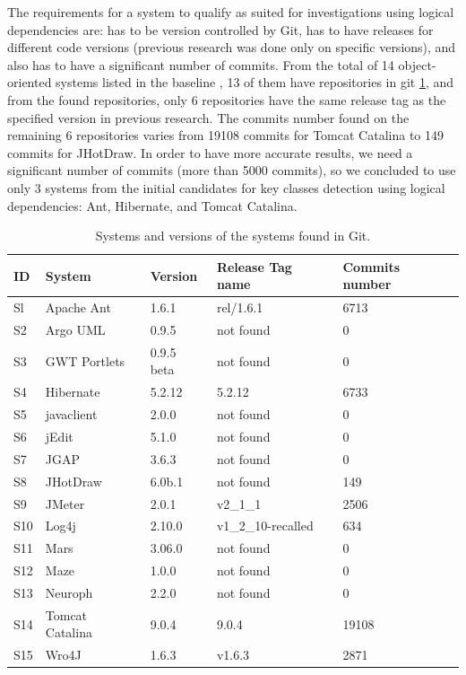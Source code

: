 \documentclass[runningheads]{comsis2}
\begin{document}
The requirements for a system to qualify as suited for investigations using logical dependencies are: has to be version controlled by Git, has to have releases for different code versions (previous research was done only on specific versions), and also has to have a significant number of commits. 
From the total of 14 object-oriented systems listed in the baseline \cite{Finding-key-classes}, 13 of them have repositories in git \ref{tab:gitfoundsystems}, and from the found repositories, only 6 repositories have the same release tag as the specified version in previous research.
The commits number found on the remaining 6 repositories varies from 19108 commits for Tomcat Catalina to 149 commits for JHotDraw. In order to have more accurate results, we need a significant number of commits (more than 5000 commits), so we concluded to use only 3 systems from the initial candidates for key classes detection using logical dependencies:  Ant, Hibernate, and Tomcat Catalina.  

\begin{table}
\renewcommand{\arraystretch}{1}
\caption{Systems and versions of the systems found in Git. }
\label{tab:gitfoundsystems}
\centering
\begin{tabular}{lllll}
\hline
ID	&	System	&	Version	&	Release Tag name	&	Commits number	\\
\hline
Sl	&	Apache Ant	&	1.6.1	&	rel/1.6.1	&	6713	\\
S2	&	Argo UML	&	0.9.5	&	not found	&	0	\\
S3	&	GWT Portlets	&	0.9.5 beta	&	not found	&	0	\\
S4	&	Hibernate 	&	5.2.12	&	5.2.12	&	6733	\\
S5	&	javaclient	&	2.0.0	&	not found	&	0	\\
S6	&	jEdit	&	5.1.0	&	not found	&	0	\\
S7	&	JGAP	&	3.6.3	&	not found	&	0	\\
S8	&	JHotDraw	&	6.0b.1	&	not found	&	149	\\
S9	&	JMeter	&	2.0.1	&	v2\_1\_1	&	2506	\\
S10	&	Log4j	&	2.10.0	&	v1\_2\_10-recalled	&	634	\\
S11	&	Mars	&	3.06.0	&	not found	&	0	\\
S12	&	Maze	&	1.0.0	&	not found	&	0	\\
S13	&	Neuroph	&	2.2.0	&	not found	&	0	\\
S14	&	Tomcat Catalina	&	9.0.4	&	9.0.4	&	19108	\\
S15	&	Wro4J	&	1.6.3	&	v1.6.3	&	2871	\\
\hline
\end{tabular}
\end{table}
\end{document}
